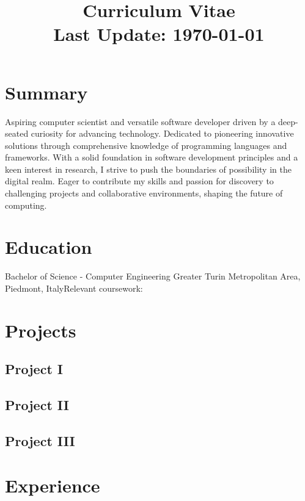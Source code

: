 \documentclass[letterpaper, nocolor, draft]{moderncv}
\begin{document}
\title{Curriculum Vitae\\[1em]\small Last Update: \today}
\maketitle

\section{Summary}
Aspiring computer scientist and versatile software developer driven by a deep-seated curiosity for advancing technology. Dedicated to pioneering innovative solutions through comprehensive knowledge of programming languages and frameworks. With a solid foundation in software development principles and a keen interest in research, I strive to push the boundaries of possibility in the digital realm. Eager to contribute my skills and passion for discovery to challenging projects and collaborative environments, shaping the future of computing.

\section{Education}
 {Bachelor of Science - Computer Engineering}{
Greater Turin Metropolitan Area, Piedmont, Italy}{}{Relevant coursework:   }

\section{Projects}
\subsection{Project I}
\cvlistitem{}

\subsection{Project II}
\cvlistitem{}

\subsection{Project III}
\cvlistitem{}

\section{Experience}
\end{document}
